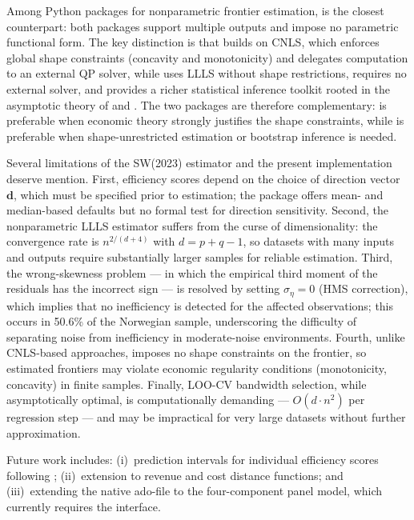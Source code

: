 \documentclass[article]{jss}
\begin{document}
Among Python packages for nonparametric frontier estimation,
 \citep{DaiFangLeeKuosmanen2024} is the closest counterpart:
both packages support multiple outputs and impose no parametric functional
form.  The key distinction is that  builds on CNLS, which
enforces global shape constraints (concavity and monotonicity) and delegates
computation to an external QP solver, while  uses LLLS
without shape restrictions, requires no external solver, and provides
a richer statistical inference toolkit rooted in the asymptotic theory
of \citet{SimarWilson2023} and \citet{PSVKZ2024}.
The two packages are therefore complementary:  is preferable
when economic theory strongly justifies the shape constraints, while
 is preferable when shape-unrestricted estimation or
bootstrap inference is needed.

Several limitations of the SW(2023) estimator and the present
implementation deserve mention.
First, efficiency scores depend on the choice of direction vector
$\mathbf{d}$, which must be specified prior to estimation; the package
offers mean- and median-based defaults but no formal test for
direction sensitivity.
Second, the nonparametric LLLS estimator suffers from the curse of
dimensionality: the convergence rate is $n^{2/(d+4)}$ with
$d = p+q-1$, so datasets with many inputs and outputs require
substantially larger samples for reliable estimation.
Third, the wrong-skewness problem --- in which the empirical third
moment of the residuals has the incorrect sign --- is resolved by
setting $\hat\sigma_\eta = 0$ (HMS correction), which implies that
no inefficiency is detected for the affected observations; this occurs
in 50.6\% of the Norwegian sample, underscoring the difficulty of
separating noise from inefficiency in moderate-noise environments.
Fourth, unlike CNLS-based approaches,  imposes no shape
constraints on the frontier, so estimated frontiers may violate
economic regularity conditions (monotonicity, concavity) in finite
samples.
Finally, LOO-CV bandwidth selection, while asymptotically optimal,
is computationally demanding --- $O(d \cdot n^2)$ per regression
step --- and may be impractical for very large datasets without
further approximation.

Future work includes: (i)~prediction intervals for individual efficiency
scores following \citet{SimarWilson2010}; (ii)~extension to revenue and
cost distance functions; and (iii)~extending the native 
ado-file to the four-component panel model, which currently requires
the  interface.
\end{document}
